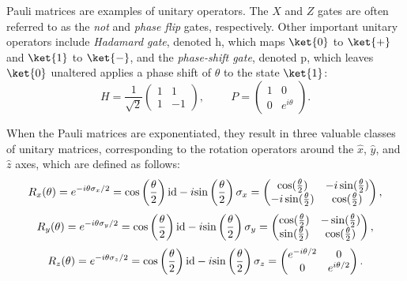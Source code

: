 \begin{example}
Pauli matrices are examples of unitary operators. The $X$ and $Z$ gates are often referred to as the \emph{not} and \emph{phase flip} gates, respectively. Other important unitary operators include   \emph{Hadamard gate}, denoted \gls{h}, which maps $\ket{0}$ to $\ket{+}$ and $\ket{1}$ to  $\ket{-}$, and the \emph{phase-shift gate}, denoted \gls{p}, which leaves $\ket{0}$ unaltered applies a phase shift of $\theta$ to the state $\ket{1}$:
\begin{equation*}
 H = \frac{1}{\sqrt{2}}\begin{pmatrix} 1 & 1\\ 1 & -1 \end{pmatrix}, \hspace{1cm} P = \begin{pmatrix} 1 & 0\\ 0 & e^{i \theta} \end{pmatrix}.
\end{equation*}
 
When the Pauli matrices are exponentiated, they result in three valuable classes of unitary matrices, corresponding to the rotation operators around the $\hat{x}$, $\hat{y}$, and $\hat{z}$ axes, which are defined as follows:
\begin{equation*}
  R_{x}(\theta) = e^{-i\theta \sigma_{x}/2} = \text{cos} \left(\frac{\theta}{2} \right) \mathrm{id} -i \text{sin} \left(\frac{\theta}{2} \right) \sigma_{x} = \begin{pmatrix} \cos(\frac{\theta}{2}) & -i\sin(\frac{\theta}{2})\\ -i\sin(\frac{\theta}{2}) & \cos(\frac{\theta}{2}) \end{pmatrix},
\end{equation*}
\begin{equation*}
  R_{y}(\theta) = e^{-i\theta \sigma_{y}/2} = \text{cos} \left(\frac{\theta}{2} \right) \mathrm{id} -i \text{sin} \left(\frac{\theta}{2} \right) \sigma_{y} = \begin{pmatrix} \cos(\frac{\theta}{2}) & -\sin(\frac{\theta}{2})\\ \sin(\frac{\theta}{2}) & \cos(\frac{\theta}{2}) \end{pmatrix},
\end{equation*}
\begin{equation*}
  R_{z}(\theta) = e^{-i\theta \sigma_{z}/2} = \text{cos} \left(\frac{\theta}{2} \right) \mathrm{id} -i \text{sin} \left(\frac{\theta}{2} \right) \sigma_{z} = \begin{pmatrix} e^{-i\theta/2} & 0\\ 0 & e^{i\theta/2} \end{pmatrix}.
\end{equation*}
\end{example}

